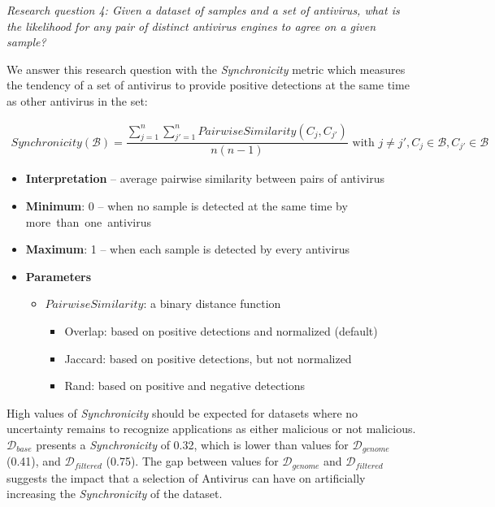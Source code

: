 \begin{mdframed}[roundcorner=10pt,nobreak=true]
        {\em Research question 4: Given a dataset of samples and a set of antivirus, what is the likelihood for any pair of distinct antivirus engines to agree on a given sample?}
\end{mdframed}

We answer this research question with the \emph{Synchronicity} metric which measures the tendency of a set of antivirus to provide positive detections at the same time as other antivirus in the set:

\begin{mdframed}[hidealllines=true,nobreak=true]
\begin{gather*}
	Synchronicity(\mathcal{B}) = \dfrac{\sum^n_{j=1} \sum^{n}_{j'=1}
	PairwiseSimilarity(C_j, C_{j'})}{n (n-1)} \text{ with }
	j \neq j', C_j \in \mathcal{B}, C_{j'} \in \mathcal{B}
\end{gather*}

\begin{itemize}
	\item{\textbf{Interpretation}} -- average pairwise similarity between pairs of antivirus
	\item{\textbf{Minimum}}: 0 -- when no sample is detected at the same time by more~than~one~antivirus
	\item{\textbf{Maximum}}: 1 -- when each sample is detected by every antivirus
	\item{\textbf{Parameters}}
	      \begin{itemize}
		      \item{$PairwiseSimilarity$}: a binary distance function~\cite{pfitzner_characterization_2009}
		            \begin{itemize}
			            \item{Overlap}: based on positive detections and normalized (default)
			            \item{Jaccard}: based on positive detections, but not normalized
			            \item{Rand}: based on positive and negative detections
		            \end{itemize}
	      \end{itemize}
\end{itemize}
\end{mdframed}

High values of \emph{Synchronicity} should be expected for datasets where no uncertainty remains to recognize applications as either malicious or not malicious.
$\mathcal{D}_{base}$ presents a \emph{Synchronicity} of 0.32, which is lower than values for $\mathcal{D}_{genome}$ (0.41), and $\mathcal{D}_{filtered}$ (0.75).
The gap between values for $\mathcal{D}_{genome}$ and $\mathcal{D}_{filtered}$ suggests the impact that a selection of Antivirus can have on artificially increasing the \emph{Synchronicity} of the dataset.
